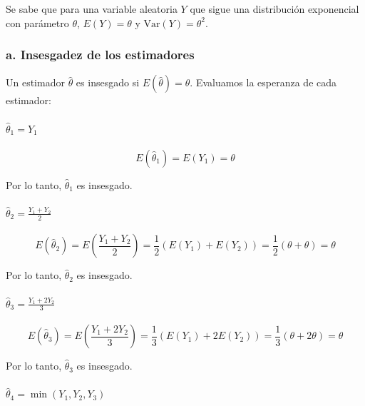 \documentclass[
]{article}
\begin{document}
Se sabe que para una variable aleatoria \(Y\) que sigue una distribución exponencial con parámetro \(\theta\), \(E(Y) = \theta\) y \(\text{Var}(Y) = \theta^2\).

\subsubsection{a. Insesgadez de los estimadores}\label{a.-insesgadez-de-los-estimadores}

Un estimador \(\hat{\theta}\) es insesgado si \(E(\hat{\theta}) = \theta\). Evaluamos la esperanza de cada estimador:

\paragraph{\texorpdfstring{\(\hat{\theta}_1 = Y_1\)}{\textbackslash hat\{\textbackslash theta\}\_1 = Y\_1}}\label{hattheta_1-y_1}

\[
E(\hat{\theta}_1) = E(Y_1) = \theta
\]

Por lo tanto, \(\hat{\theta}_1\) es insesgado.

\paragraph{\texorpdfstring{\(\hat{\theta}_2 = \frac{Y_1 + Y_2}{2}\)}{\textbackslash hat\{\textbackslash theta\}\_2 = \textbackslash frac\{Y\_1 + Y\_2\}\{2\}}}\label{hattheta_2-fracy_1-y_22}

\[
E(\hat{\theta}_2) = E\left(\frac{Y_1 + Y_2}{2}\right) = \frac{1}{2}(E(Y_1) + E(Y_2)) = \frac{1}{2}(\theta + \theta) = \theta
\]

Por lo tanto, \(\hat{\theta}_2\) es insesgado.

\paragraph{\texorpdfstring{\(\hat{\theta}_3 = \frac{Y_1 + 2Y_2}{3}\)}{\textbackslash hat\{\textbackslash theta\}\_3 = \textbackslash frac\{Y\_1 + 2Y\_2\}\{3\}}}\label{hattheta_3-fracy_1-2y_23}

\[
E(\hat{\theta}_3) = E\left(\frac{Y_1 + 2Y_2}{3}\right) = \frac{1}{3}(E(Y_1) + 2E(Y_2)) = \frac{1}{3}(\theta + 2\theta) = \theta
\]

Por lo tanto, \(\hat{\theta}_3\) es insesgado.

\paragraph{\texorpdfstring{\(\hat{\theta}_4 = \min(Y_1, Y_2, Y_3)\)}{\textbackslash hat\{\textbackslash theta\}\_4 = \textbackslash min(Y\_1, Y\_2, Y\_3)}}\label{hattheta_4-miny_1-y_2-y_3}
\end{document}
